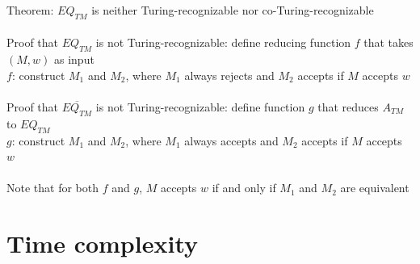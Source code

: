 \documentclass{article}
\newcommand*{\<}{\langle}
\renewcommand*{\>}{\rangle}
\begin{document}
			Theorem: $EQ_{TM}$ is neither Turing-recognizable nor co-Turing-recognizable \\
			\\
			Proof that $EQ_{TM}$ is not Turing-recognizable: define reducing function $f$ that takes $(M, w)$ as input \\
			$f$: construct $M_1$ and $M_2$, where $M_1$ always rejects and $M_2$ accepts if $M$ accepts $w$ \\
			\\
			Proof that $\overline{EQ_{TM}}$ is not Turing-recognizable: define function $g$ that reduces $A_{TM}$ to $EQ_{TM}$ \\
			$g$: construct $M_1$ and $M_2$, where $M_1$ always accepts and $M_2$ accepts if $M$ accepts $w$ \\
			\\
			Note that for both $f$ and $g$, $M$ accepts $w$ if and only if $M_1$ and $M_2$ are equivalent
		\clearpage

	\section{Time complexity}
\end{document}
